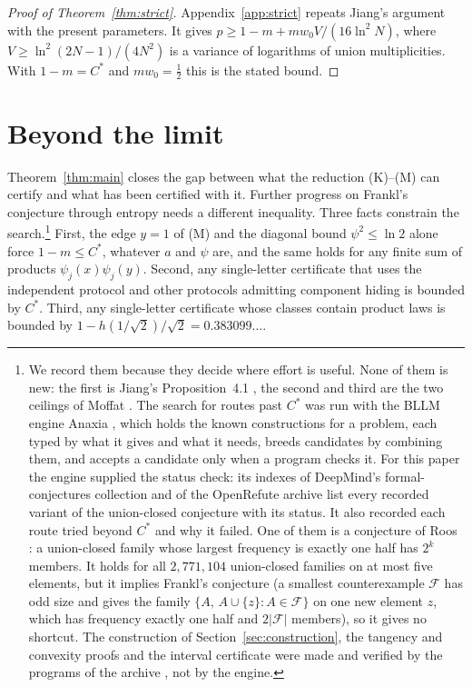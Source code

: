 \documentclass[aps,prd,twocolumn,superscriptaddress,nofootinbib,longbibliography,floatfix,amsmath,amssymb,10pt]{revtex4-2}
\theoremstyle{plain}
\theoremstyle{definition}
\theoremstyle{plain}
\newcommand{\cF}{\mathcal{F}}
\newcommand{\Cs}{C^{*}}
\begin{document}
\begin{proof}[Proof of Theorem~\ref{thm:strict}]
Appendix~\ref{app:strict} repeats Jiang's argument \cite[Proposition~10.3]{Jia26} with the present parameters. It gives $p\ge 1-m+mw_0V/(16\ln^2N)$, where $V\ge\ln^2(2N-1)/(4N^2)$ is a variance of logarithms of union multiplicities. With $1-m=\Cs$ and $mw_0=\frac12$ this is the stated bound.
\end{proof}

\section{Beyond the limit}\label{sec:beyond}

Theorem~\ref{thm:main} closes the gap between what the reduction (K)--(M) can certify and what has been certified with it. Further progress on Frankl's conjecture through entropy needs a different inequality. Three facts constrain the search.\footnote{We record them because they decide where effort is useful. None of them is new: the first is Jiang's Proposition~4.1 \cite{Jia26}, the second and third are the two ceilings of Moffat \cite{Mof26}. The search for routes past $\Cs$ was run with the BLLM engine Anaxia \cite{Ana26}, which holds the known constructions for a problem, each typed by what it gives and what it needs, breeds candidates by combining them, and accepts a candidate only when a program checks it. For this paper the engine supplied the status check: its indexes of DeepMind's formal-conjectures collection and of the OpenRefute archive list every recorded variant of the union-closed conjecture with its status. It also recorded each route tried beyond $\Cs$ and why it failed. One of them is a conjecture of Roos \cite{Roo23}: a union-closed family whose largest frequency is exactly one half has $2^k$ members. It holds for all $2{,}771{,}104$ union-closed families on at most five elements, but it implies Frankl's conjecture (a smallest counterexample $\cF$ has odd size and gives the family $\{A,\,A\cup\{z\}:A\in\cF\}$ on one new element $z$, which has frequency exactly one half and $2|\cF|$ members), so it gives no shortcut. The construction of Section~\ref{sec:construction}, the tangency and convexity proofs and the interval certificate were made and verified by the programs of the archive \cite{BB26z}, not by the engine.} First, the edge $y=1$ of (M) and the diagonal bound $\psi^2\le\ln2$ alone force $1-m\le\Cs$, whatever $a$ and $\psi$ are, and the same holds for any finite sum of products $\psi_j(x)\psi_j(y)$. Second, any single-letter certificate that uses the independent protocol and other protocols admitting component hiding is bounded by $\Cs$. Third, any single-letter certificate whose classes contain product laws is bounded by $1-h(1/\sqrt2)/\sqrt2=0.383099\ldots$.
\end{document}
